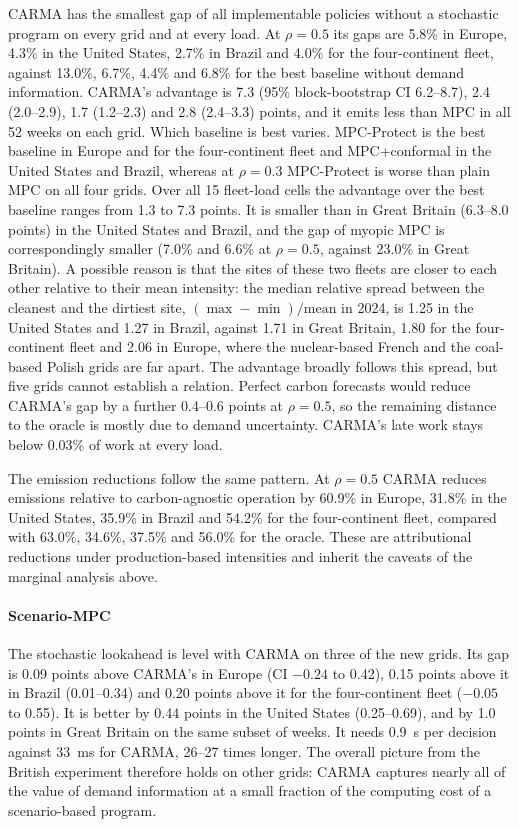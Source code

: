 CARMA has the smallest gap of all implementable policies without a stochastic program on every grid and at every load. At $\rho=0.5$ its gaps are 5.8\% in Europe, 4.3\% in the United States, 2.7\% in Brazil and 4.0\% for the four-continent fleet, against 13.0\%, 6.7\%, 4.4\% and 6.8\% for the best baseline without demand information. CARMA's advantage is 7.3 (95\% block-bootstrap CI 6.2--8.7), 2.4 (2.0--2.9), 1.7 (1.2--2.3) and 2.8 (2.4--3.3) points, and it emits less than MPC in all 52 weeks on each grid. Which baseline is best varies. MPC-Protect is the best baseline in Europe and for the four-continent fleet and MPC+conformal in the United States and Brazil, whereas at $\rho=0.3$ MPC-Protect is worse than plain MPC on all four grids. Over all 15 fleet-load cells the advantage over the best baseline ranges from 1.3 to 7.3 points. It is smaller than in Great Britain (6.3--8.0 points) in the United States and Brazil, and the gap of myopic MPC is correspondingly smaller (7.0\% and 6.6\% at $\rho=0.5$, against 23.0\% in Great Britain). A possible reason is that the sites of these two fleets are closer to each other relative to their mean intensity: the median relative spread between the cleanest and the dirtiest site, $(\max-\min)/\text{mean}$ in 2024, is 1.25 in the United States and 1.27 in Brazil, against 1.71 in Great Britain, 1.80 for the four-continent fleet and 2.06 in Europe, where the nuclear-based French and the coal-based Polish grids are far apart. The advantage broadly follows this spread, but five grids cannot establish a relation. Perfect carbon forecasts would reduce CARMA's gap by a further 0.4--0.6 points at $\rho=0.5$, so the remaining distance to the oracle is mostly due to demand uncertainty. CARMA's late work stays below 0.03\% of work at every load.

The emission reductions follow the same pattern. At $\rho=0.5$ CARMA reduces emissions relative to carbon-agnostic operation by 60.9\% in Europe, 31.8\% in the United States, 35.9\% in Brazil and 54.2\% for the four-continent fleet, compared with 63.0\%, 34.6\%, 37.5\% and 56.0\% for the oracle. These are attributional reductions under production-based intensities and inherit the caveats of the marginal analysis above.

\paragraph{Scenario-MPC} The stochastic lookahead is level with CARMA on three of the new grids. Its gap is 0.09 points above CARMA's in Europe (CI $-0.24$ to 0.42), 0.15 points above it in Brazil (0.01--0.34) and 0.20 points above it for the four-continent fleet ($-0.05$ to 0.55). It is better by 0.44 points in the United States (0.25--0.69), and by 1.0 points in Great Britain on the same subset of weeks. It needs 0.9~s per decision against 33~ms for CARMA, 26--27 times longer. The overall picture from the British experiment therefore holds on other grids: CARMA captures nearly all of the value of demand information at a small fraction of the computing cost of a scenario-based program.

